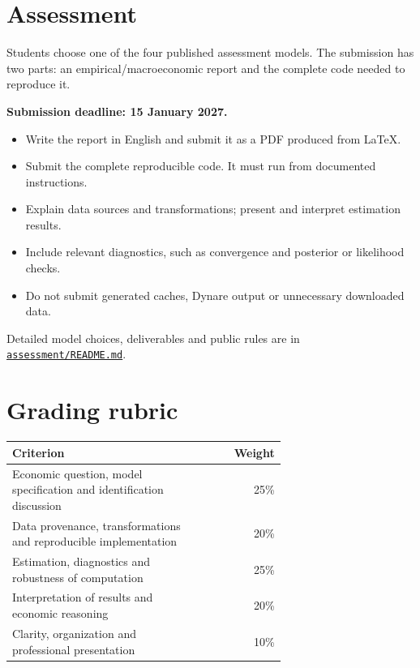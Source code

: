 \documentclass[11pt,a4paper]{article}
\begin{document}
\section*{Assessment}
Students choose one of the four published assessment models. The submission has two parts: an empirical/macroeconomic report and the complete code needed to reproduce it.

\medskip
\noindent\textbf{Submission deadline: 15 January 2027.}

\begin{itemize}
\item Write the report in English and submit it as a PDF produced from LaTeX.
\item Submit the complete reproducible code. It must run from documented instructions.
\item Explain data sources and transformations; present and interpret estimation results.
\item Include relevant diagnostics, such as convergence and posterior or likelihood checks.
\item Do not submit generated caches, Dynare output or unnecessary downloaded data.
\end{itemize}

Detailed model choices, deliverables and public rules are in \href{https://github.com/Vermandel/bayesian-techniques-macroeconomics/tree/main/assessment}{\texttt{assessment/README.md}}.

\section*{Grading rubric}
\begin{center}
\begin{tabular}{p{0.67\linewidth}r}
\toprule
Criterion & Weight \\
\midrule
Economic question, model specification and identification discussion & 25\% \\
Data provenance, transformations and reproducible implementation & 20\% \\
Estimation, diagnostics and robustness of computation & 25\% \\
Interpretation of results and economic reasoning & 20\% \\
Clarity, organization and professional presentation & 10\% \\
\bottomrule
\end{tabular}
\end{center}
\end{document}
